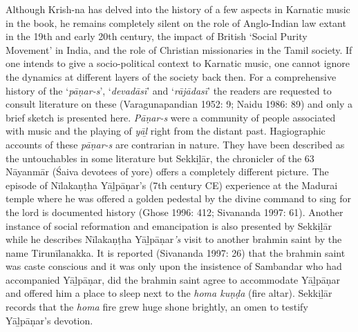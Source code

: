 Although Krish-na has delved into the history of a few aspects in Karnatic music in the book, he remains completely silent on the role of Anglo-Indian law extant in the 19th and early 20th century, the impact of British ‘Social Purity Movement’ in India, and the role of Christian missionaries in the Tamil society. If one intends to give a socio-political context to Karnatic music, one cannot ignore the dynamics at different layers of the society back then. For a comprehensive history of the ‘\textit{pāṇar-s}’, ‘\textit{devadāsī}’ and ‘\textit{rājādasī}’ the readers are requested to consult literature on these (Varagunapandian 1952: 9; Naidu 1986: 89) and only a brief sketch is presented here. \textit{Pāṇar-s} were a community of people associated with music and the playing of \textit{yāḻ} right from the distant past. Hagiographic accounts of these \textit{pāṇar-s} are contrarian in nature. They have been described as the untouchables in some literature but Sekkiḻār, the chronicler of the 63 Nāyanmār (Śaiva devotees of yore) offers a completely different picture. The episode of Nīlakaṇṭha Yāḻpāṇar’s (7th century CE) experience at the Madurai temple where he was offered a golden pedestal by the divine command to sing for the lord is documented history (Ghose 1996: 412; Sivananda 1997: 61). Another instance of social reformation and emancipation is also presented by Sekkiḻār while he describes Nīlakaṇṭha Yāḻpāṇar\textit{’s} visit to another brahmin saint by the name Tirunīlanakka. It is reported (Sivananda 1997: 26) that the brahmin saint was caste conscious and it was only upon the insistence of Sambandar who had accompanied Yāḻpāṇar, did the brahmin saint agree to accommodate Yāḻpāṇar and offered him a place to sleep next to the \textit{homa kuṇḍa} (fire altar). Sekkiḻār records that the \textit{homa} fire grew huge shone brightly, an omen to testify Yāḻpāṇar’s devotion.

